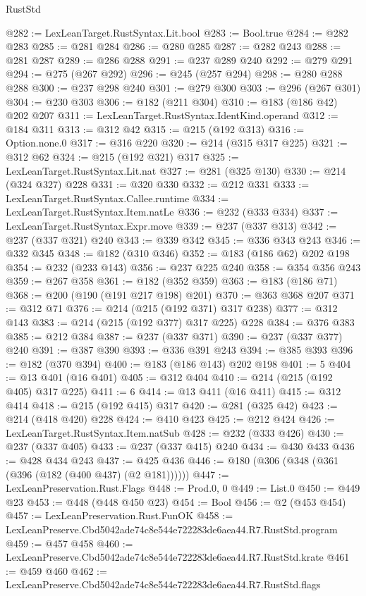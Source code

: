 \begin{lexlean}{RustStd}
\begin{coremodule}
@282 := LexLeanTarget.RustSyntax.Lit.bool
@283 := Bool.true
@284 := @282 @283
@285 := @281 @284
@286 := @280 @285
@287 := @282 @243
@288 := @281 @287
@289 := @286 @288
@291 := @237 @289 @240
@292 := @279 @291
@294 := @275 (@267 @292)
@296 := @245 (@257 @294)
@298 := @280 @288 @288
@300 := @237 @298 @240
@301 := @279 @300
@303 := @296 (@267 @301)
@304 := @230 @303
@306 := @182 (@211 @304)
@310 := @183 (@186 @42) @202 @207
@311 := LexLeanTarget.RustSyntax.IdentKind.operand
@312 := @184 @311
@313 := @312 @42
@315 := @215 (@192 @313)
@316 := Option.none.{0}
@317 := @316 @220
@320 := @214 (@315 @317 @225)
@321 := @312 @62
@324 := @215 (@192 @321) @317
@325 := LexLeanTarget.RustSyntax.Lit.nat
@327 := @281 (@325 @130)
@330 := @214 (@324 @327) @228
@331 := @320 @330
@332 := @212 @331
@333 := LexLeanTarget.RustSyntax.Callee.runtime
@334 := LexLeanTarget.RustSyntax.Item.natLe
@336 := @232 (@333 @334)
@337 := LexLeanTarget.RustSyntax.Expr.move
@339 := @237 (@337 @313)
@342 := @237 (@337 @321) @240
@343 := @339 @342
@345 := @336 @343 @243
@346 := @332 @345
@348 := @182 (@310 @346)
@352 := @183 (@186 @62) @202 @198
@354 := @232 (@233 @143)
@356 := @237 @225 @240
@358 := @354 @356 @243
@359 := @267 @358
@361 := @182 (@352 @359)
@363 := @183 (@186 @71)
@368 := @200 (@190 (@191 @217 @198) @201)
@370 := @363 @368 @207
@371 := @312 @71
@376 := @214 (@215 (@192 @371) @317 @238)
@377 := @312 @143
@383 := @214 (@215 (@192 @377) @317 @225) @228
@384 := @376 @383
@385 := @212 @384
@387 := @237 (@337 @371)
@390 := @237 (@337 @377) @240
@391 := @387 @390
@393 := @336 @391 @243
@394 := @385 @393
@396 := @182 (@370 @394)
@400 := @183 (@186 @143) @202 @198
@401 := 5
@404 := @13 @401 (@16 @401)
@405 := @312 @404
@410 := @214 (@215 (@192 @405) @317 @225)
@411 := 6
@414 := @13 @411 (@16 @411)
@415 := @312 @414
@418 := @215 (@192 @415) @317
@420 := @281 (@325 @42)
@423 := @214 (@418 @420) @228
@424 := @410 @423
@425 := @212 @424
@426 := LexLeanTarget.RustSyntax.Item.natSub
@428 := @232 (@333 @426)
@430 := @237 (@337 @405)
@433 := @237 (@337 @415) @240
@434 := @430 @433
@436 := @428 @434 @243
@437 := @425 @436
@446 := @180 (@306 (@348 (@361 (@396 (@182 (@400 @437) (@2 @181))))))
@447 := LexLeanPreservation.Rust.Flags
@448 := Prod.{0, 0}
@449 := List.{0}
@450 := @449 @23
@453 := @448 (@448 @450 @23)
@454 := Bool
@456 := @2 (@453 @454)
@457 := LexLeanPreservation.Rust.FunOK
@458 := LexLeanPreserve.Cbd5042ade74c8e544e722283de6aea44.R7.RustStd.program
@459 := @457 @458
@460 := LexLeanPreserve.Cbd5042ade74c8e544e722283de6aea44.R7.RustStd.krate
@461 := @459 @460
@462 := LexLeanPreserve.Cbd5042ade74c8e544e722283de6aea44.R7.RustStd.flags

\end{coremodule}
\end{lexlean}
